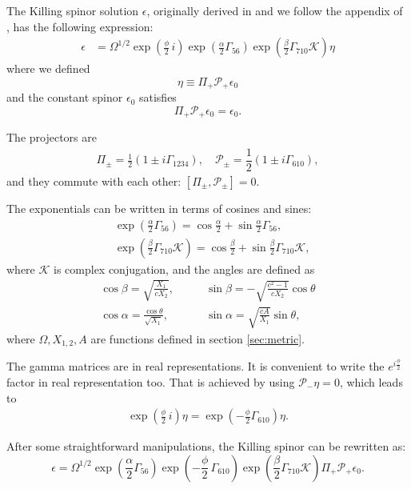 
The Killing spinor solution $\epsilon$, originally derived in \cite{Pilch:2003jg} and we follow the appendix of \cite{Chen-Lin:2015xlh}, has the following expression:
\begin{align}
\epsilon &= \Omega^{1/2} \exp{\left(\frac{\phi}{2}\, i \right)} \exp{\left(\frac{\alpha}{2}\Gamma_{56} \right)} \exp{\left(\frac{\beta}{2}\Gamma_{7 10} \mathcal{K} \right)} \eta
\end{align}
where we defined
\begin{equation}
\eta \equiv \Pi_{+} \mathcal{P}_+ \epsilon_0
\end{equation}
and the constant spinor $\epsilon_0$ satisfies
\begin{equation}
 \Pi_+ \mathcal{P}_+ \epsilon_0 = \epsilon_0.
\end{equation}

The projectors are
\begin{align}
\Pi_\pm = 
\frac{1}{2}\left(1 \pm i\Gamma_{1234}\right), 
\quad
\mathcal{P}_{\pm} =
\dfrac{1}{2} \left(1\pm i\Gamma_{6 10}\right),
\end{align}
and they commute with each other: $[\Pi_\pm, \mathcal{P}_{\pm}]=0$. 


The exponentials can be written in terms of cosines and sines:
\begin{align}
&\exp{\left(\frac{\alpha}{2}\Gamma_{56} \right)} = \cos\frac{\alpha}{2} + \sin\frac{\alpha}{2}\Gamma_{5 6},\\
&\exp{\left(\frac{\beta}{2}\Gamma_{7 10} \mathcal{K} \right)} = \cos\frac{\beta}{2} + \sin\frac{\beta}{2}\Gamma_{7 10}\mathcal{K},
\end{align}
where $\mathcal{K}$ is complex conjugation, and the angles are defined as
\begin{align}
\cos\beta = \sqrt{\frac{X_1}{c X_2}}, \quad 
&\quad
\sin\beta = -\sqrt{\frac{c^2 - 1}{c X_2}}\cos\theta\\
%
\cos\alpha = \frac{\cos\theta}{\sqrt{X_1}}, 
&\quad
\sin\alpha = \sqrt{\frac{c A}{X_1}}\sin\theta,
\end{align}
where $\Omega, X_{1,2}, A$ are functions defined in section \ref{sec:metric}.


The gamma matrices are in real representations. It is convenient to write the $e^{i \frac{\phi}{2}}$ factor in real representation too. 
That is achieved by using $\mathcal{P}_- \eta = 0 $, which leads to
\begin{align}
 \exp{\left(\frac{\phi}{2}\, i \right)} \eta 
    = \exp{\left(-\frac{\phi}{2}\Gamma_{6 10} \right)} \eta. 
\end{align}

After some straightforward manipulations, the Killing spinor can be rewritten as:
\begin{equation}\label{eq:KillingSpinor}
\epsilon =  \Omega^{1/2} \exp{\left(\frac{\alpha}{2}\Gamma_{56} \right)} \exp{\left(-\frac{\phi}{2}\, \Gamma_{6 10} \right)} \exp{\left(\frac{\beta}{2}\Gamma_{7 10} \mathcal{K} \right)} \Pi_{+} \mathcal{P}_+ \epsilon_0.
\end{equation}

